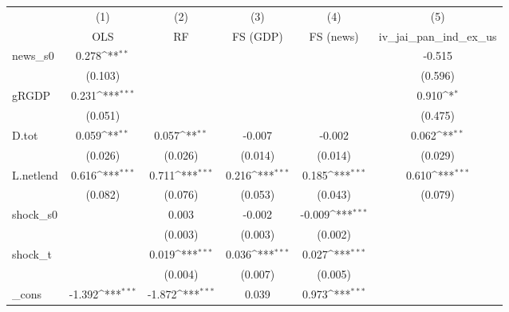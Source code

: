 {
\def\sym#1{\ifmmode^{#1}\else\(^{#1}\)\fi}
\begin{tabular}{l*{5}{c}}
\toprule
            &\multicolumn{1}{c}{(1)}&\multicolumn{1}{c}{(2)}&\multicolumn{1}{c}{(3)}&\multicolumn{1}{c}{(4)}&\multicolumn{1}{c}{(5)}\\
            &\multicolumn{1}{c}{OLS}&\multicolumn{1}{c}{RF}&\multicolumn{1}{c}{FS (GDP)}&\multicolumn{1}{c}{FS (news)}&\multicolumn{1}{c}{iv\_jai\_pan\_ind\_ex\_us}\\
\midrule
news\_s0     &       0.278\sym{**} &                     &                     &                     &      -0.515         \\
            &     (0.103)         &                     &                     &                     &     (0.596)         \\
\addlinespace
gRGDP       &       0.231\sym{***}&                     &                     &                     &       0.910\sym{*}  \\
            &     (0.051)         &                     &                     &                     &     (0.475)         \\
\addlinespace
D.tot       &       0.059\sym{**} &       0.057\sym{**} &      -0.007         &      -0.002         &       0.062\sym{**} \\
            &     (0.026)         &     (0.026)         &     (0.014)         &     (0.014)         &     (0.029)         \\
\addlinespace
L.netlend   &       0.616\sym{***}&       0.711\sym{***}&       0.216\sym{***}&       0.185\sym{***}&       0.610\sym{***}\\
            &     (0.082)         &     (0.076)         &     (0.053)         &     (0.043)         &     (0.079)         \\
\addlinespace
shock\_s0    &                     &       0.003         &      -0.002         &      -0.009\sym{***}&                     \\
            &                     &     (0.003)         &     (0.003)         &     (0.002)         &                     \\
\addlinespace
shock\_t     &                     &       0.019\sym{***}&       0.036\sym{***}&       0.027\sym{***}&                     \\
            &                     &     (0.004)         &     (0.007)         &     (0.005)         &                     \\
\addlinespace
\_cons      &      -1.392\sym{***}&      -1.872\sym{***}&       0.039         &       0.973\sym{***}&                     \\

\end{tabular}}
